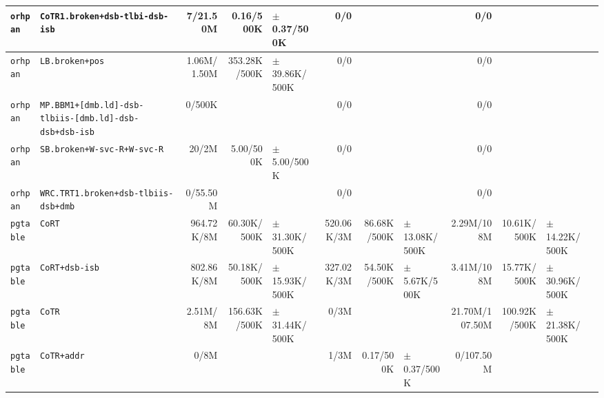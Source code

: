 \begin{tabular}{l l  | r r l | r r l | r r l l}
         \verb|orhpan| &                        \verb|CoTR1.broken+dsb-tlbi-dsb-isb| &       7/21.50M &             0.16/500K &   $\pm$ 0.37/500K &            0/0 &                       &                   &            0/0 &                       &                    & \\ \hline 
         \verb|orhpan| &                                        \verb|LB.broken+pos| &    1.06M/1.50M &          353.28K/500K & $\pm$ 39.86K/500K &            0/0 &                       &                   &            0/0 &                       &                    & \\ \hline 
         \verb|orhpan| & \verb|MP.BBM1+[dmb.ld]-dsb-tlbiis-[dmb.ld]-dsb-dsb+dsb-isb| &         0/500K &                       &                   &            0/0 &                       &                   &            0/0 &                       &                    & \\ \hline 
         \verb|orhpan| &                            \verb|SB.broken+W-svc-R+W-svc-R| &          20/2M &             5.00/500K &   $\pm$ 5.00/500K &            0/0 &                       &                   &            0/0 &                       &                    & \\ \hline 
         \verb|orhpan| &                   \verb|WRC.TRT1.broken+dsb-tlbiis-dsb+dmb| &       0/55.50M &                       &                   &            0/0 &                       &                   &            0/0 &                       &                    & \\ \hline 
        \verb|pgtable| &                                                 \verb|CoRT| &     964.72K/8M &           60.30K/500K & $\pm$ 31.30K/500K &     520.06K/3M &           86.68K/500K & $\pm$ 13.08K/500K &     2.29M/108M &           10.61K/500K &  $\pm$ 14.22K/500K & \\ \hline 
        \verb|pgtable| &                                         \verb|CoRT+dsb-isb| &     802.86K/8M &           50.18K/500K & $\pm$ 15.93K/500K &     327.02K/3M &           54.50K/500K &  $\pm$ 5.67K/500K &     3.41M/108M &           15.77K/500K &  $\pm$ 30.96K/500K & \\ \hline 
        \verb|pgtable| &                                                 \verb|CoTR| &       2.51M/8M &          156.63K/500K & $\pm$ 31.44K/500K &           0/3M &                       &                   & 21.70M/107.50M &          100.92K/500K &  $\pm$ 21.38K/500K & \\ \hline 
        \verb|pgtable| &                                            \verb|CoTR+addr| &           0/8M &                       &                   &           1/3M &             0.17/500K &   $\pm$ 0.37/500K &      0/107.50M &                       &                    & \\ \hline 

\end{tabular}
